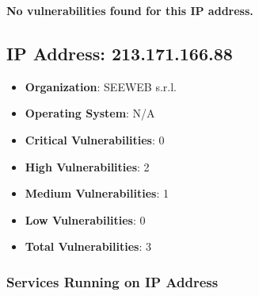 \documentclass{article}
\begin{document}
\textbf{No vulnerabilities found for this IP address.}




\clearpage



\subsection*{IP Address: 213.171.166.88}

\begin{itemize}
    \item \textbf{Organization}: SEEWEB s.r.l.
    \item \textbf{Operating System}:  N/A 
    \item \textbf{Critical Vulnerabilities}: 0
    \item \textbf{High Vulnerabilities}: 2
    \item \textbf{Medium Vulnerabilities}: 1
    \item \textbf{Low Vulnerabilities}: 0
    \item \textbf{Total Vulnerabilities}: 3
\end{itemize}

\subsubsection*{Services Running on IP Address}
\end{document}
